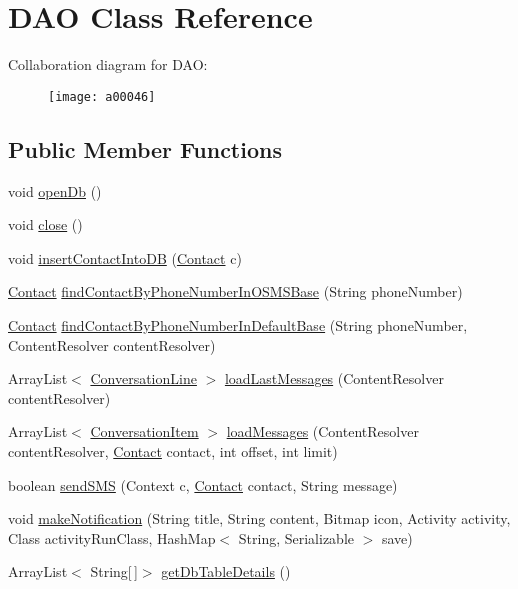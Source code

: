 \hypertarget{a00009}{\section{D\+A\+O Class Reference}
\label{a00009}
}


Collaboration diagram for D\+A\+O\+:
\nopagebreak
\begin{figure}[H]
\begin{center}
\leavevmode
\texttt{[image: a00046]}
\end{center}
\end{figure}
\subsection*{Public Member Functions}
\begin{DoxyCompactItemize}
\item 
void \hyperlink{a00009_a0e9c1cf6abb64bc19b9c3bdec9eb750b}{open\+Db} ()
\item 
void \hyperlink{a00009_a5ae591df94fc66ccb85cbb6565368bca}{close} ()
\item 
void \hyperlink{a00009_a0d261830f979d2b82adddde282a4074d}{insert\+Contact\+Into\+D\+B} (\hyperlink{a00005}{Contact} c)
\item 
\hyperlink{a00005}{Contact} \hyperlink{a00009_a5eb135eeb76cb1557170dc43443b0c5d}{find\+Contact\+By\+Phone\+Number\+In\+O\+S\+M\+S\+Base} (String phone\+Number)
\item 
\hyperlink{a00005}{Contact} \hyperlink{a00009_ac877f70a0e827e3855b81178f5746b3a}{find\+Contact\+By\+Phone\+Number\+In\+Default\+Base} (String phone\+Number, Content\+Resolver content\+Resolver)
\item 
Array\+List$<$ \hyperlink{a00008}{Conversation\+Line} $>$ \hyperlink{a00009_a47fd191a6b728f32b3b232b836d97f1c}{load\+Last\+Messages} (Content\+Resolver content\+Resolver)
\item 
Array\+List$<$ \hyperlink{a00007}{Conversation\+Item} $>$ \hyperlink{a00009_acc6f8d4836ab29c22365b7f6e0763a15}{load\+Messages} (Content\+Resolver content\+Resolver, \hyperlink{a00005}{Contact} contact, int offset, int limit)
\item 
boolean \hyperlink{a00009_aefc9fb17466b37d1b0a6f37ecbcb9657}{send\+S\+M\+S} (Context c, \hyperlink{a00005}{Contact} contact, String message)
\item 
void \hyperlink{a00009_a056267ebf36c250c0b67cca3564ea3f9}{make\+Notification} (String title, String content, Bitmap icon, Activity activity, Class activity\+Run\+Class, Hash\+Map$<$ String, Serializable $>$ save)
\item 
Array\+List$<$ String\mbox{[}$\,$\mbox{]}$>$ \hyperlink{a00009_ad6830b697058550025465b603b1b254a}{get\+Db\+Table\+Details} ()
\end{DoxyCompactItemize}
